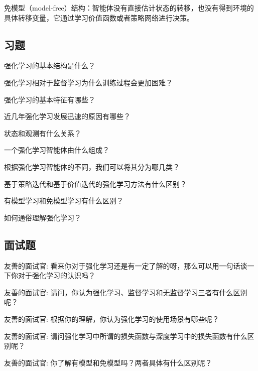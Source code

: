 免模型（model-free）结构：智能体没有直接估计状态的转移，也没有得到环境的具体转移变量，它通过学习价值函数或者策略网络进行决策。


\subsection{习题}

 强化学习的基本结构是什么？

 强化学习相对于监督学习为什么训练过程会更加困难？

 强化学习的基本特征有哪些？ 

 近几年强化学习发展迅速的原因有哪些？

 状态和观测有什么关系？

 一个强化学习智能体由什么组成？

 根据强化学习智能体的不同，我们可以将其分为哪几类？

 基于策略迭代和基于价值迭代的强化学习方法有什么区别？

 有模型学习和免模型学习有什么区别？

 如何通俗理解强化学习？


\subsection{面试题} 

 友善的面试官: 看来你对于强化学习还是有一定了解的呀，那么可以用一句话谈一下你对于强化学习的认识吗？

 友善的面试官: 请问，你认为强化学习、监督学习和无监督学习三者有什么区别呢？

 友善的面试官: 根据你的理解，你认为强化学习的使用场景有哪些呢？

 友善的面试官: 请问强化学习中所谓的损失函数与深度学习中的损失函数有什么区别呢？

 友善的面试官: 你了解有模型和免模型吗？两者具体有什么区别呢？

